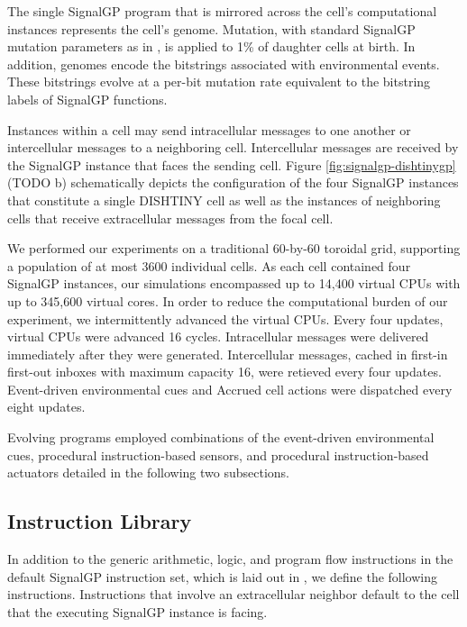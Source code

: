 The single SignalGP program that is mirrored across the cell's computational instances represents the cell's genome.
Mutation, with standard SignalGP mutation parameters as in \cite{lalejini2018evolving}, is applied to 1\% of daughter cells at birth.
In addition, genomes encode the bitstrings associated with environmental events.
These bitstrings evolve at a per-bit mutation rate equivalent to the bitstring labels of SignalGP functions.

Instances within a cell may send intracellular messages to one another or intercellular messages to a neighboring cell.
Intercellular messages are received by the SignalGP instance that faces the sending cell.
Figure \ref{fig:signalgp-dishtinygp}(TODO b) schematically depicts the configuration of the four SignalGP instances that constitute a single DISHTINY cell as well as the instances of neighboring cells that receive extracellular messages from the focal cell.

We performed our experiments on a traditional 60-by-60 toroidal grid, supporting a population of at most 3600 individual cells.
As each cell contained four SignalGP instances, our simulations encompassed up to 14,400 virtual CPUs with up to 345,600 virtual cores.
In order to reduce the computational burden of our experiment, we intermittently advanced the virtual CPUs.
Every four updates, virtual CPUs were advanced 16 cycles.
Intracellular messages were delivered immediately after they were generated.
Intercellular messages, cached in first-in first-out inboxes with maximum capacity 16, were retieved every four updates.
Event-driven environmental cues and Accrued cell actions were dispatched every eight updates.

Evolving programs employed combinations of the event-driven environmental cues, procedural instruction-based sensors, and procedural instruction-based actuators detailed in the following two subsections.

\subsection{Instruction Library}

In addition to the generic arithmetic, logic, and program flow instructions in the default SignalGP instruction set, which is laid out in \cite{lalejini2018evolving}, we define the following instructions.
Instructions that involve an extracellular neighbor default to the cell that the executing SignalGP instance is facing.

